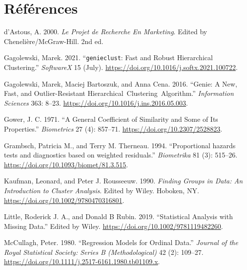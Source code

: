 \documentclass[
  11pt,
  letterpaper,
]{scrbook}
\newlength{\cslhangindent}
\newlength{\cslentryspacingunit} %
\newenvironment{CSLReferences}[2] %
 {%
  \setlength{\parindent}{0pt}
  \ifodd #1
  \let\oldpar\par
  \def\par{\hangindent=\cslhangindent\oldpar}
  \fi
  \setlength{\parskip}{#2\cslentryspacingunit}
 }%
 {}
\theoremstyle{definition}
\theoremstyle{remark}
\begin{document}

\hypertarget{ruxe9fuxe9rences}{%
\chapter*{Références}\label{ruxe9fuxe9rences}}


\hypertarget{refs}{}
\begin{CSLReferences}{1}{0}
\leavevmode{}%
d'Astous, A. 2000. \emph{Le Projet de Recherche En Marketing}. Edited by
Chenelière/McGraw-Hill. 2nd ed.

\leavevmode{}%
Gagolewski, Marek. 2021. {``\texttt{genieclust}: Fast and Robust
Hierarchical Clustering.''} \emph{SoftwareX} 15 (July).
\url{https://doi.org/10.1016/j.softx.2021.100722}.

\leavevmode{}%
Gagolewski, Marek, Maciej Bartoszuk, and Anna Cena. 2016. {``Genie: A
New, Fast, and Outlier-Resistant Hierarchical~Clustering~Algorithm.''}
\emph{Information Sciences} 363: 8--23.
\url{https://doi.org/10.1016/j.ins.2016.05.003}.

\leavevmode{}%
Gower, J. C. 1971. {``A General Coefficient of Similarity and Some of
Its Properties.''} \emph{Biometrics} 27 (4): 857--71.
\url{https://doi.org/10.2307/2528823}.

\leavevmode{}%
Grambsch, Patricia M., and Terry M. Therneau. 1994. {``{Proportional
hazards tests and diagnostics based on weighted residuals}.''}
\emph{Biometrika} 81 (3): 515--26.
\url{https://doi.org/10.1093/biomet/81.3.515}.

\leavevmode{}%
Kaufman, Leonard, and Peter J. Rousseeuw. 1990. \emph{Finding Groups in
Data: An Introduction to Cluster Analysis}. Edited by Wiley. Hoboken,
NY. \url{https://doi.org/10.1002/9780470316801}.

\leavevmode{}%
Little, Roderick J. A., and Donald B Rubin. 2019. {``Statistical
Analysis with Missing Data.''} Edited by Wiley.
\url{https://doi.org/10.1002/9781119482260}.

\leavevmode{}%
McCullagh, Peter. 1980. {``Regression Models for Ordinal Data.''}
\emph{Journal of the Royal Statistical Society: Series B
(Methodological)} 42 (2): 109--27.
\url{https://doi.org/10.1111/j.2517-6161.1980.tb01109.x}.


\end{CSLReferences}
\end{document}
